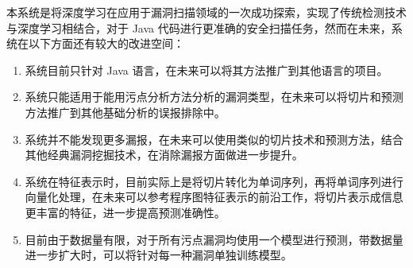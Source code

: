 本系统是将深度学习在应用于漏洞扫描领域的一次成功探索，实现了传统检测技术与深度学习相结合，对于 Java 代码进行更准确的安全扫描任务，然而在未来，系统在以下方面还有较大的改进空间：

\begin{enumerate}
    \item 系统目前只针对 Java 语言，在未来可以将其方法推广到其他语言的项目。
    \item 系统只能适用于能用污点分析方法分析的漏洞类型，在未来可以将切片和预测方法推广到其他基础分析的误报排除中。
    \item 系统并不能发现更多漏报，在未来可以使用类似的切片技术和预测方法，结合其他经典漏洞挖掘技术，在消除漏报方面做进一步提升。
    \item 系统在特征表示时，目前实际上是将切片转化为单词序列，再将单词序列进行向量化处理，在未来可以参考程序图特征表示的前沿工作，将切片表示成信息更丰富的特征，进一步提高预测准确性。
    \item 目前由于数据量有限，对于所有污点漏洞均使用一个模型进行预测，带数据量进一步扩大时，可以将针对每一种漏洞单独训练模型。
\end{enumerate}